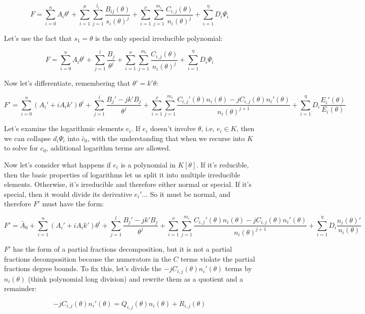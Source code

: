 $$F = \sum_{i=0}^n A_i \theta^i + \sum_{i=1}^\mu \sum_{j=1}^{l_i} \frac{B_{ij}(\theta)}{s_i(\theta)^j}
+ \sum_{i=1}^\nu \sum_{j=1}^{m_i} \frac{C_{i,j}(\theta)}{n_i(\theta)^j}
+ \sum_{i=1}^\eta D_i \Psi_i$$

Let's use the fact that $s_1 = \theta$ is the only
special irreducible polynomial:

$$F = \sum_{i=0}^n A_i \theta^i + \sum_{j=1}^{l} \frac{B_{j}}{\theta^j}
+ \sum_{i=1}^\nu \sum_{j=1}^{m_i} \frac{C_{i,j}(\theta)}{n_i(\theta)^j}
+ \sum_{i=1}^\eta D_i \Psi_i$$

Now let's differentiate, remembering that $\theta' = k'\theta$:

$$F' = \sum_{i=0}^n (A_i' + i A_i k' )\theta^i
  + \sum_{j=1}^{l} \frac{B_{j}' - j k' B_{j}}{\theta^j}
  + \sum_{i=1}^\nu \sum_{j=1}^{m_i} \frac{C_{i,j}'(\theta) n_i(\theta) - j C_{i,j}(\theta) n_i'(\theta) }{n_i(\theta)^{j+1}}
  + \sum_{i=1}^\eta D_i \frac{E_i'(\theta)}{E_i(\theta)}$$

Let's examine the logarithmic elements $e_i$.  If $e_i$ doesn't involve $\theta$, i.e, $e_i \in K$,
then we can collapse $d_i \Psi_i$ into $\bar{c}_0$, with the understanding that when we recurse
into $K$ to solve for $c_0$, additional logarithm terms are allowed.

Now let's consider what happens if $e_i$ is a polynomial in $K[\theta]$.  If it's reducible, then
the basic properties of logarithms let us split it into multiple irreducible elements.
Otherwise, it's irreducible and therefore either normal or special.  If it's special, then it would
divide its derivative $e_i'$... So it must be normal, and therefore $F'$ must have the form:

$$F' = \bar{A}_0 + \sum_{i=1}^n (A_i' + i A_i k' )\theta^i
  + \sum_{j=1}^{l} \frac{B_{j}' - j k' B_{j}}{\theta^j}
  + \sum_{i=1}^\nu \sum_{j=1}^{m_i} \frac{C_{i,j}'(\theta) n_i(\theta) - j C_{i,j}(\theta) n_i'(\theta) }{n_i(\theta)^{j+1}}
  + \sum_{i=1}^\eta D_i \frac{n_i(\theta)'}{n_i(\theta)}$$

$F'$ has the form of a partial fractions decomposition, but it is not
a partial fractions decomposition because the numerators in the $C$
terms violate the partial fractions degree bounds.  To fix this, let's
divide the $-jC_{i,j}(\theta)n_i'(\theta)$ terms by $n_i(\theta)$
(think polynomial long division) and rewrite them as a quotient
and a remainder:

$$-jC_{i,j}(\theta)n_i'(\theta) = Q_{i,j}(\theta) n_i(\theta) + R_{i,j}(\theta)$$


